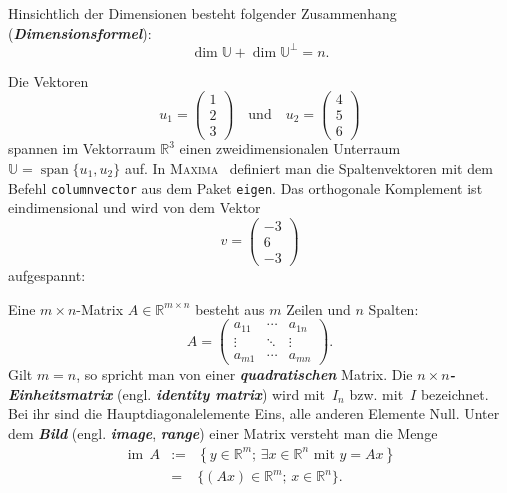 Hinsichtlich der Dimensionen besteht folgender Zusammenhang (\textbf{\em Dimensionsformel}):
\begin{equation}
\dim\mathbb{U}+\dim\mathbb{U}^{\perp}=n.\label{eq:dimensionsformel-ortho-kompl}
\end{equation}
\begin{example}
\label{exa:orthogonales-Komplement}Die Vektoren
\[
u_{1}=\left(\begin{array}{c}
1\\
2\\
3
\end{array}\right)\quad\text{und}\quad u_{2}=\left(\begin{array}{c}
4\\
5\\
6
\end{array}\right)
\]
spannen im Vektorraum ${\mathbb{R}}^{3}$ einen zweidimensionalen Unterraum
$\mathbb{U}={\operatorname{span}}\{u_{1},u_{2}\}$ auf. In \textsc{Maxima}~\cite{maxima,haager2014}
definiert man die Spaltenvektoren mit dem Befehl \texttt{columnvector}
aus dem Paket \texttt{eigen}. Das orthogonale Komplement ist eindimensional
und wird von dem Vektor
\[
v=\left(\begin{array}{c}
-3\\
6\\
-3
\end{array}\right)
\]
aufgespannt:


\end{example}
Eine $m\times n$-Matrix $A\in{\mathbb{R}}^{m\times n}$ besteht aus $m$ Zeilen
und $n$ Spalten:
\[
A=\left(\begin{array}{ccc}
a_{11} & \cdots & a_{1n}\\
\vdots & \ddots & \vdots\\
a_{m1} & \cdots & a_{mn}
\end{array}\right).
\]
Gilt $m=n$, so spricht man von einer \textbf{\em quadratischen} Matrix.
Die $n\times n$\textbf{\em -Einheitsmatrix} (engl. \textbf{\em identity matrix})
wird mit~$I_{n}$ bzw. mit~$I$ bezeichnet. Bei ihr sind die Hauptdiagonalelemente
Eins, alle anderen Elemente Null.
Unter dem \textbf{\em Bild} (engl. \textbf{\em image}, \textbf{\em range}) einer Matrix
versteht man die Menge
\[
\begin{array}{lrl}
{\operatorname{im}}\,A & := & \left\{ y\in{\mathbb{R}}^{m};\,\exists x\in{\mathbb{R}}^{n}\textrm{ mit }y=Ax\right\} \\
 & = & \{(Ax)\in{\mathbb{R}}^{m};\,x\in{\mathbb{R}}^{n}\}.
\end{array}
\]
